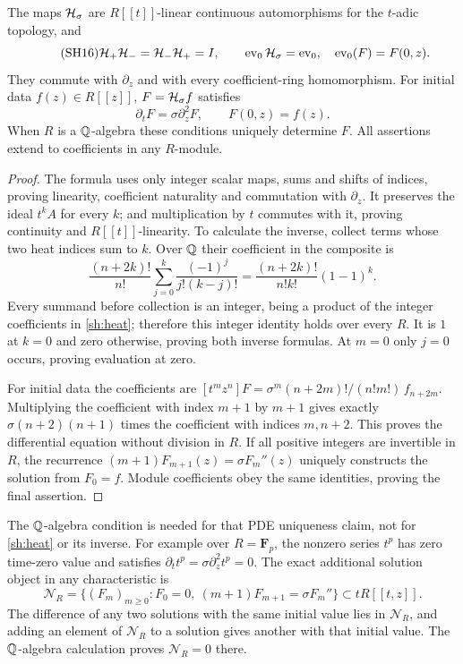 \begin{theorem}\label{sh:heatproperties}
The maps $\mathcal H_\sigma$ are $R[[t]]$-linear continuous
automorphisms for the $t$-adic topology, and
\begin{equation}\tag{SH16}\label{sh:inverseheat}
 \mathcal H_+\mathcal H_-=\mathcal H_-\mathcal H_+=I,\qquad
 \operatorname{ev}_0\mathcal H_\sigma=\operatorname{ev}_0,
 \quad\operatorname{ev}_0(F)=F(0,z).
\end{equation}
They commute with $\partial_z$ and with every coefficient-ring
homomorphism. For initial data $f(z)\in R[[z]]$,
$F=\mathcal H_\sigma f$ satisfies
\begin{equation}\tag{SH17}\label{sh:pde}
 \partial_tF=\sigma\partial_z^2F,\qquad F(0,z)=f(z).
\end{equation}
When $R$ is a $\mathbb Q$-algebra these conditions uniquely determine
$F$. All assertions extend to coefficients in any $R$-module.
\end{theorem}
\begin{proof}
The formula uses only integer scalar maps, sums and shifts of
indices, proving linearity, coefficient naturality and commutation
with $\partial_z$. It preserves the ideal $t^kA$ for every $k$;
and multiplication by $t$ commutes with it, proving continuity
and $R[[t]]$-linearity. To calculate the inverse, collect terms
whose two heat indices sum to $k$. Over $\mathbb Q$ their coefficient
in the composite is
\[
 \frac{(n+2k)!}{n!}
 \sum_{j=0}^k\frac{(-1)^j}{j!(k-j)!}
 =\frac{(n+2k)!}{n!k!}(1-1)^k.
\]
Every summand before collection is an integer, being a product
of the integer coefficients in \eqref{sh:heat}; therefore this
integer identity holds over every $R$. It is $1$ at $k=0$
and zero otherwise, proving both inverse formulas.
At $m=0$ only $j=0$ occurs, proving evaluation at zero.

For initial data the coefficients are
$[t^mz^n]F=\sigma^m(n+2m)!/(n!m!)\,f_{n+2m}$.
Multiplying the coefficient with index $m+1$ by $m+1$
gives exactly $\sigma(n+2)(n+1)$ times the coefficient with
indices $m,n+2$. This proves the differential equation without
division in $R$. If all positive integers are invertible in $R$,
the recurrence
$(m+1)F_{m+1}(z)=\sigma F_m''(z)$ uniquely constructs the
solution from $F_0=f$. Module coefficients obey the same
identities, proving the final assertion.
\end{proof}

The $\mathbb Q$-algebra condition is needed for that PDE uniqueness
claim, not for \eqref{sh:heat} or its inverse. For example over
$R=\mathbf F_p$, the nonzero series $t^p$ has zero time-zero
value and satisfies $\partial_t t^p=\sigma\partial_z^2t^p=0$.
The exact additional solution object in any characteristic is
\begin{equation}\tag{SH18}\label{sh:pdetorsion}
 \mathcal N_R=
 \{(F_m)_{m\ge0}:F_0=0,\ 
       (m+1)F_{m+1}=\sigma F_m''\}\subset tR[[t,z]].
\end{equation}
The difference of any two solutions with the same initial value
lies in $\mathcal N_R$, and adding an element of $\mathcal N_R$
to a solution gives another with that initial value. The
$\mathbb Q$-algebra calculation proves $\mathcal N_R=0$ there.

